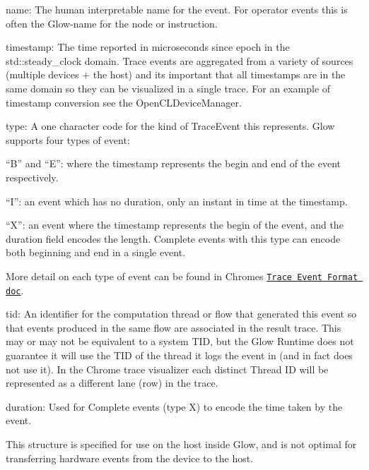 \begin{DoxyItemize}
\item name\+: The human interpretable name for the event. For operator events this is often the Glow-\/name for the node or instruction.
\item timestamp\+: The time reported in microseconds since epoch in the std\+::steady\+\_\+clock domain. Trace events are aggregated from a variety of sources (multiple devices + the host) and it\textquotesingle{}s important that all timestamps are in the same domain so they can be visualized in a single trace. For an example of timestamp conversion see the Open\+C\+L\+Device\+Manager.
\item type\+: A one character code for the kind of Trace\+Event this represents. Glow supports four types of event\+:
\begin{DoxyItemize}
\item “\+B” and “\+E”\+: where the timestamp represents the begin and end of the event respectively.
\item “\+I”\+: an event which has no duration, only an instant in time at the timestamp.
\item “\+X”\+: an event where the timestamp represents the begin of the event, and the duration field encodes the length. Complete events with this type can encode both beginning and end in a single event.
\item More detail on each type of event can be found in Chrome\textquotesingle{}s \href{https://docs.google.com/document/d/1CvAClvFfyA5R-PhYUmn5OOQtYMH4h6I0nSsKchNAySU}{\tt Trace Event Format doc}.
\end{DoxyItemize}
\item tid\+: An identifier for the computation thread or flow that generated this event so that events produced in the same flow are associated in the result trace. This may or may not be equivalent to a system T\+ID, but the Glow Runtime does not guarantee it will use the T\+ID of the thread it logs the event in (and in fact does not use it). In the Chrome trace visualizer each distinct Thread ID will be represented as a different lane (row) in the trace.
\item duration\+: Used for Complete events (type \textquotesingle{}X\textquotesingle{}) to encode the time taken by the event.
\end{DoxyItemize}

This structure is specified for use on the host inside Glow, and is not optimal for transferring hardware events from the device to the host.

